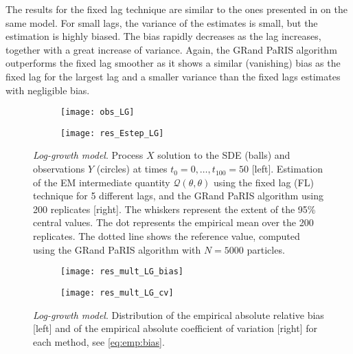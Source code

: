 \documentclass[12pt]{article}
\newcommand{\1}{\mathrm{1}}
\begin{document}
The results for the fixed lag technique are similar to the ones presented in \cite[Figure 1]{olsson:strojby:2011} on the same model. For small lags, the variance of the estimates is small, but the estimation is highly biased. The bias rapidly decreases as the lag increases, together with a  great increase of variance.  Again, the GRand PaRIS algorithm outperforms the fixed lag smoother as it shows  a similar (vanishing) bias as the fixed lag for the largest lag and a smaller variance than the fixed lags estimates with negligible bias. 

\begin{figure}[p]
\centering
\begin{subfigure}{0.49\textwidth}
\texttt{[image: obs\_LG]}
\end{subfigure}
\begin{subfigure}{0.49\textwidth}
\texttt{[image: res\_Estep\_LG]}
\end{subfigure}
\caption{{\em Log-growth model}. Process $X$ solution to the SDE (balls) and observations $Y$ (circles) at times $t_0=0,\dots,t_{100}=50$ [left]. Estimation of the EM intermediate quantity $\mathcal{Q}(\theta,\theta)$  using the fixed lag (FL) technique for 5 different lags, and the GRand PaRIS algorithm using 200 replicates [right]. The whiskers represent the extent of the 95\% central values. The dot represents the empirical mean over the 200 replicates. The dotted line shows the reference value, computed using the GRand PaRIS algorithm with $N=5000$ particles.}
\label{fig:res:LG}
\end{figure}
\begin{figure}[p]
\centering
\begin{subfigure}{0.49\textwidth}
\texttt{[image: res\_mult\_LG\_bias]}
\end{subfigure}
\begin{subfigure}{0.49\textwidth}
\texttt{[image: res\_mult\_LG\_cv]}
\end{subfigure}
\caption{{\em Log-growth model}. Distribution of the empirical absolute relative bias [left] and of the empirical absolute coefficient of variation [right] for each method, see \eqref{eq:emp:bias}.}
\label{fig:mult:LG}
\end{figure}
\end{document}
